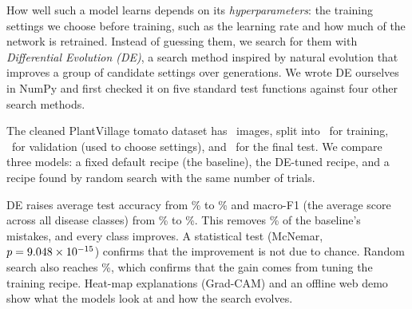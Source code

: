 How well such a model learns depends on its \emph{hyperparameters}: the training settings we choose before training, such as the learning rate and how much of the network is retrained. Instead of guessing them, we search for them with \emph{Differential Evolution (DE)}, a search method inspired by natural evolution that improves a group of candidate settings over generations. We wrote DE ourselves in NumPy and first checked it on five standard test functions against four other search methods.

The cleaned PlantVillage tomato dataset has \TotalN\ images, split into \TrainN\ for training, \ValN\ for validation (used to choose settings), and \TestN\ for the final test. We compare three models: a fixed default recipe (the baseline), the DE-tuned recipe, and a recipe found by random search with the same number of trials.

DE raises average test accuracy from \BaseAcc\% to \DEAcc\% and macro-F1 (the average score across all disease classes) from \BaseFone\% to \DEFone\%. This removes \ErrorReduction\% of the baseline's mistakes, and every class improves. A statistical test (McNemar, $p=\num{9.048e-15}$) confirms that the improvement is not due to chance. Random search also reaches \RSAcc\%, which confirms that the gain comes from tuning the training recipe. Heat-map explanations (Grad-CAM) and an offline web demo show what the models look at and how the search evolves.
\clearpage
